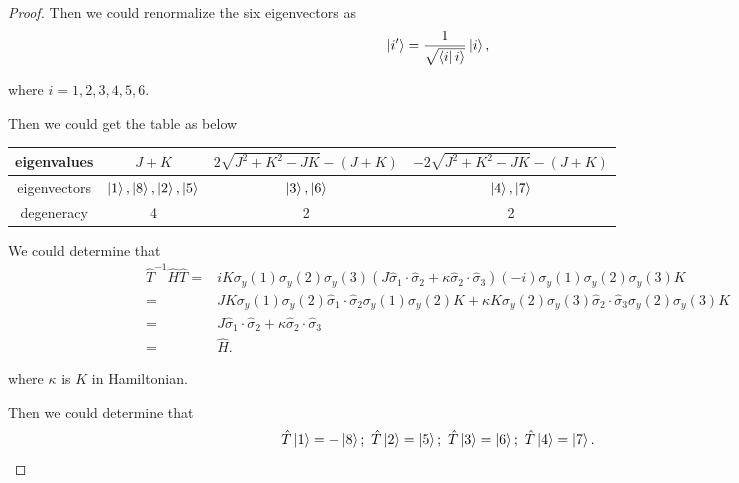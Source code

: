 \documentclass[reqno,a4paper,12pt]{amsart}
\begin{document}
\begin{enumerate}[1.]
\begin{proof}
Then we could renormalize the six eigenvectors as 
\[
	\ket{i'} = \frac{1}{\sqrt{\bra{i} i \rangle }} \ket{i},
\]

where $i = 1, 2, 3, 4, 5, 6$.

Then we could get the table as below 
\begin{table}[h!]
\centering
\begin{tabular}{|c|c|c|c|}
	\hline
	eigenvalues & $J+K$ & $2\sqrt{J^2+K^2-JK} - (J+K)$ &  $-2\sqrt{J^2+K^2-JK} - (J+K)$ \\
	\hline
	eigenvectors & $\ket{1}, \ket{8}, \ket{2}, \ket{5}$ & $\ket{3}, \ket{6}$ & $\ket{4}, \ket{7}$ \\
	\hline
	degeneracy & 4 & 2 & 2 \\
	\hline
\end{tabular}
\end{table}

We could determine that 
\begin{align*}
	\hat{T}^{-1} \hat{H} \hat{T} =& iK \sigma_y(1) \sigma_y(2) \sigma_y(3) (J \hat{\sigma}_1 \cdot \hat{\sigma}_2 + \kappa \hat{\sigma}_2 \cdot \hat{\sigma}_3) (-i) \sigma_y(1) \sigma_y(2) \sigma_y(3) K \\
	=& J K \sigma_y(1) \sigma_y(2) \hat{\sigma}_1 \cdot \hat{\sigma}_2 \sigma_y(1) \sigma_y(2) K + \kappa K \sigma_y(2) \sigma_y(3) \hat{\sigma}_2 \cdot \hat{\sigma}_3 \sigma_y(2) \sigma_y(3) K \\
	=& J \hat{\sigma}_1 \cdot \hat{\sigma}_2 + \kappa \hat{\sigma}_2 \cdot \hat{\sigma}_3 \\
	=& \hat{H}.
\end{align*}

where $\kappa$ is $K$ in Hamiltonian.

Then we could determine that 
\[
	\hat{T} \ket{1} = -\ket{8}; \ \hat{T} \ket{2} = \ket{5}; \ \hat{T} \ket{3} = \ket{6}; \ \hat{T} \ket{4} = \ket{7}.
\]
\end{proof}

\medskip
\end{enumerate}
\end{document}
